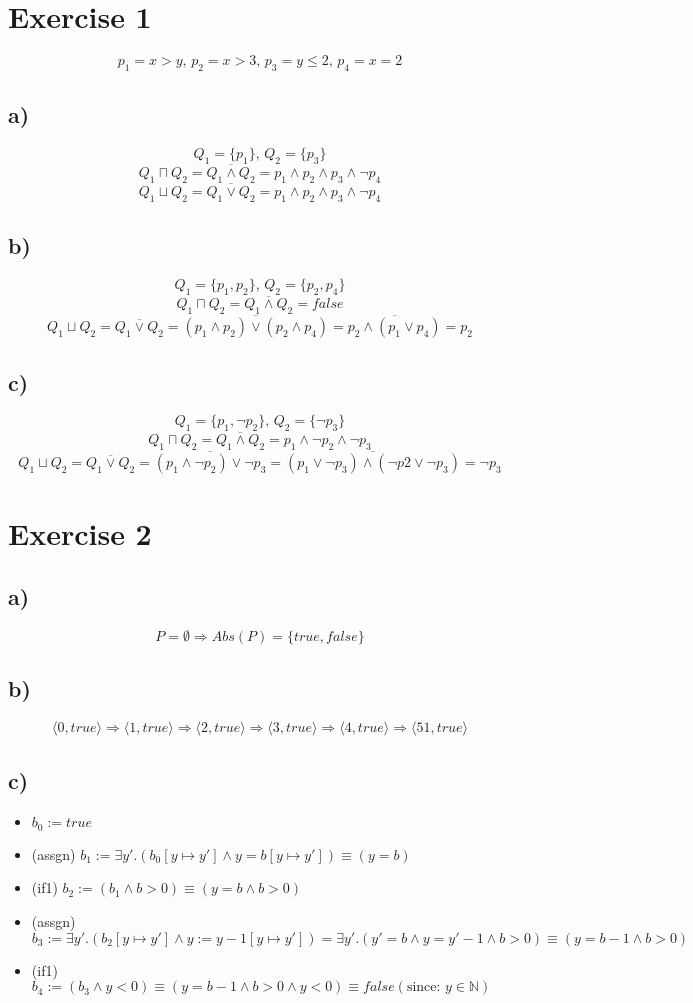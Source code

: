 \documentclass[fleqn,12pt]{article}
\begin{document}
\section*{Exercise 1}
$$p_1 = x>y \text{, }p_2 = x>3 \text{, }p_3 = y \leq 2 \text{, } p_4 = x = 2$$
\subsection*{a)}
$$Q_1 = \{p_1\}\text{, } Q_2 =  \{p_3\}$$
$$Q_1 \sqcap Q_2 = \overline{Q_1 \wedge Q_2} = p_1 \wedge p_2 \wedge p_3 \wedge \lnot p_4$$
$$Q_1 \sqcup Q_2 = \overline{Q_1 \vee Q_2} = p_1 \wedge p_2 \wedge p_3 \wedge \lnot p_4$$
\subsection*{b)}
$$Q_1 = \{p_1,p_2\}\text{, } Q_2 =  \{p_2,p_4\}$$
$$Q_1 \sqcap Q_2 = \overline{Q_1 \wedge Q_2} = false$$
$$Q_1 \sqcup Q_2 = \overline{Q_1 \vee Q_2} = \overline{(p_1 \wedge p_2) \vee (p_2 \wedge p_4)} = \overline{p_2 \wedge (p_1 \vee p_4)} = p_2$$
\subsection*{c)}
$$Q_1 = \{p_1,\lnot p_2\}\text{, } Q_2 =  \{\lnot p_3\}$$
$$Q_1 \sqcap Q_2 = \overline{Q_1 \wedge Q_2} = p_1 \wedge \lnot p_2 \wedge \lnot p_3$$
$$Q_1 \sqcup Q_2 = \overline{Q_1 \vee Q_2} = \overline{(p_1 \wedge \lnot p_2) \vee \lnot p_3} = \overline{(p_1 \vee \lnot p_3) \wedge (\lnot p2 \vee \lnot p_3)} = \lnot p_3$$
\section*{Exercise 2}

\subsection*{a)}
$$P=\emptyset \Rightarrow Abs(P) = \{true,false\}$$
\subsection*{b)}
$$\langle 0, true \rangle \Rightarrow \langle 1, true \rangle \Rightarrow \langle 2, true \rangle \Rightarrow \langle 3, true \rangle \Rightarrow \langle 4, true \rangle \Rightarrow \langle 51, true \rangle$$
\subsection*{c)}
\begin{itemize}
\item $b_0 := true$
\item (assgn) $b_1 := \exists y'.(b_0[y\mapsto y'] \wedge y=b[y \mapsto y']) \equiv (y=b) $
\item (if1) $b_2 := (b_1 \wedge b > 0) \equiv (y=b \wedge b>0)$
\item (assgn) $b_3 := \exists y'. (b_2[y \mapsto y'] \wedge y := y -1 [y \mapsto y']) =  \exists y'. (y'=b \wedge y = y' - 1 \wedge b>0) \equiv (y=b - 1 \wedge b>0)$
\item (if1) $b_4 := (b_3 \wedge y < 0) \equiv (y=b-1 \wedge b>0 \wedge y<0) \equiv false(\text{since: }y \in \mathbb{N})$
\end{itemize}
\end{document}
